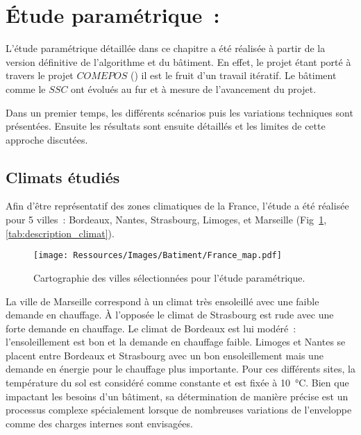 \section{Étude paramétrique~:} %
\label{sec:etude_parametrique_}
L’étude paramétrique détaillée dans ce chapitre a été réalisée à partir de la
version définitive de l’algorithme et du bâtiment. En effet, le projet étant
porté à travers le projet $COMEPOS$ ()
il est le fruit d’un travail itératif. Le bâtiment comme le $SSC$ ont évolués au fur et à mesure
de l’avancement du projet.

Dans un premier temps, les différents scénarios puis les variations techniques
sont présentées. Ensuite les résultats sont ensuite détaillés et les limites
de cette approche discutées.


\subsection{Climats étudiés} %
\label{sub:climats_etudies}
Afin d’être représentatif des zones climatiques de la France, l’étude a été réalisée
pour 5 villes~: Bordeaux, Nantes, Strasbourg, Limoges, et Marseille (Fig~\ref{fig:carte_france},
\autoref{tab:description_climat}).
\begin{figure}
    \begin{center}
        \texttt{[image: Ressources/Images/Batiment/France\_map.pdf]}
    \end{center}
    \caption{Cartographie des villes sélectionnées pour l’étude paramétrique.
             \label{fig:carte_france}}
\end{figure}
La ville de Marseille correspond à un climat très ensoleillé avec une faible demande en
chauffage. À l’opposée le climat de Strasbourg est rude avec
une forte demande en chauffage. Le climat de Bordeaux est lui modéré~: l’ensoleillement est bon
et la demande en chauffage faible. Limoges et Nantes se placent entre Bordeaux et
Strasbourg avec un bon ensoleillement mais une demande en énergie pour le chauffage plus
importante. Pour ces différents sites, la température du sol est
considéré comme constante et est fixée à \SI{10}{\celsius}. Bien que impactant les besoins
d’un bâtiment, sa détermination de manière précise est un processus complexe spécialement
lorsque de nombreuses variations de l’enveloppe comme des charges internes sont envisagées.

